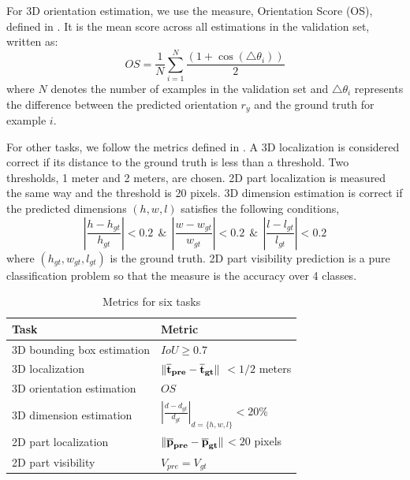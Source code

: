\documentclass[a4paper,12pt]{article}
\begin{document}
For 3D orientation estimation, we use the measure, Orientation Score (OS), defined in \cite{DBLP:journals/corr/MousavianAFK16}. It is the mean score across all estimations in the validation set, written as:
\begin{equation}
	OS =\frac{1}{N} \sum_{i=1}^N\frac{(1+\cos(\triangle \theta_i))}{2}
\end{equation}
where $N$ denotes the number of examples in the validation set and $\triangle \theta_i$ represents the difference between the predicted orientation $r_y$ and the ground truth for example $i$.

 For other tasks, we follow the metrics defined in \cite{DBLP:journals/corr/ChabotCRTC17}. A 3D localization is considered correct if its distance to the ground truth is less than a threshold. Two thresholds, 1 meter and 2 meters, are chosen. 2D part localization is measured the same way and the threshold is 20 pixels. 3D dimension estimation is correct if the predicted dimensions $(h, w, l)$ satisfies the following conditions,
\begin{equation}
	\left | \frac{h-h_{gt}}{h_{gt}} \right | < 0.2  ~~\&~~\left | \frac{w-w_{gt}}{w_{gt}} \right | < 0.2  ~~\&~~ \left | \frac{l-l_{gt}}{l_{gt}} \right | < 0.2
\end{equation}
where $(h_{gt}, w_{gt}, l_{gt})$ is the ground truth. 2D part visibility prediction is a pure classification problem so that the measure is the accuracy over 4 classes.


\renewcommand{\arraystretch}{1.5}
\begin{table}[ht]
	\centering
	\caption{Metrics for six tasks}
	\label{metric}
	\begin{tabular}{|m{6cm}|m{6cm}|}
		\hline
		Task                    & Metric         \\ \hline
		3D bounding box estimation    & $IoU \geq 0.7$ \\  \hline
		3D localization         &$\bf \lVert \overline t_{pre} - \overline t_{gt} \rVert$ $< 1 / 2$ meters   \\ \hline
		3D orientation estimation  & $OS$     \\ \hline
		3D dimension estimation & $\left | \frac{d-d_{gt}}{d_{gt}} \right | _{d =\{h,w,l\}}<  20\%$           \\ \hline
		2D part localization    & $ \bf \lVert \overline p_{pre} - \overline p_{gt} \rVert $$<  20$ pixels      \\ \hline
		2D part visibility      &     $V_{pre} = V_{gt}$         \\ \hline
	\end{tabular}
\end{table}
\end{document}
